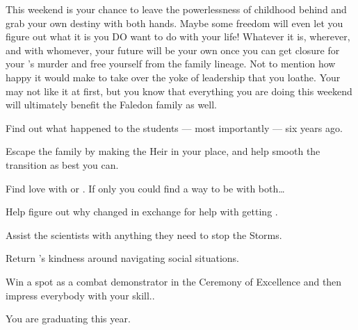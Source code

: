 \documentclass[char]{GL2020}
\begin{document}
{This weekend is your chance to leave the powerlessness of childhood behind and grab your own destiny with both hands. Maybe some freedom will even let you figure out what it is you DO want to do with your life! Whatever it is, wherever, and with whomever, your future will be your own once you can get closure for your \cHeirSibling{\sibling}'s murder and free yourself from the family lineage. Not to mention how happy it would make \cAmbition{} to take over the yoke of leadership that you loathe. Your \cFaledonParent{\parent} may not like it at first, but you know that everything you are doing this weekend will ultimately benefit the Faledon family as well.  

\begin{itemz}
    \item Find out what happened to the students — most importantly \cHeirSibling{} — six years ago.
    \item Escape the \cHeir{\formal} family by making \cAmbition{} the Heir in your place, and help smooth the transition as best you can.  
    \item Find love with \cChupStudent{} or \cPresident{}. If only you could find a way to be with both\ldots{}
    \item Help \cWarlordDaughter{} figure out why \cLoud{} changed in exchange for \cWarlordDaughter{\their} help with getting \iMirror{}.
    \item Assist the scientists with anything they need to stop the Storms.
     \item Return \cAssistantScientist{}’s kindness around navigating social situations.
    \item Win a spot as a combat demonstrator in the Ceremony of Excellence and then impress everybody with your skill..
\end{itemz}

\begin{itemz}[Notes]
    \item You are graduating this year.
\end{itemz}

}
\end{document}
